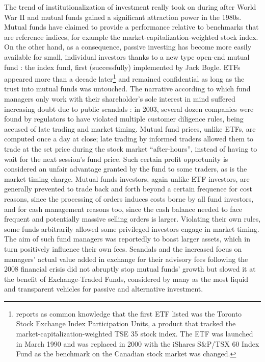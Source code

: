 The trend of institutionalization of investment really took on during after World War II and mutual funds gained a significant attraction power in the 1980s. Mutual funds have claimed to provide a performance relative to benchmarks that are reference indices, for example the market-capitalization-weighted stock index. On the other hand, as a consequence, passive investing has become more easily available for small, individual investors thanks to a new type open-end mutual fund : the index fund, first (successfully) implemented by Jack Bogle. ETFs appeared more than a decade later\footnote{\textcite{Charupat2013} reports as common knowledge that the first ETF listed was the Toronto Stock Exchange Index Participation Units, a product that tracked the market-capitalization-weighted TSE 35 stock index. The ETF was launched in March 1990 and was replaced in 2000 with the iShares S\&P/TSX 60 Index Fund as the benchmark on the Canadian stock market was changed.} and remained confidential as long as the trust into mutual funds was untouched. The narrative according to which fund managers only work with their shareholder's sole interest in mind suffered increasing doubt due to public scandals : in 2003, several dozen companies were found by regulators to have violated multiple customer diligence rules, being accused of late trading and market timing. Mutual fund prices, unlike ETFs, are computed once a day at close; late trading by informed traders allowed them to trade at the set price during the stock market ``after-hours'', instead of having to wait for the next session's fund price. Such certain profit opportunity is considered an unfair advantage granted by the fund to some traders, as is the market timing charge. Mutual funds investors, again unlike ETF investors, are generally prevented to trade back and forth beyond a certain frequence for cost reasons, since the processing of orders induces costs borne by all fund investors, and for cash management reasons too, since the cash balance needed to face frequent and potentially massive selling orders is larger. Violating their own rules, some funds arbitrarily allowed some privileged investors engage in market timing. The aim of such fund managers was reportedly to boast larger assets, which in turn positively influence their own fees. Scandals and the increased focus on managers' actual value added in exchange for their advisory fees following the 2008 financial crisis did not abruptly stop mutual funds' growth but slowed it at the benefit of Exchange-Traded Funds, considered by many as the most liquid and transparent vehicles for passive and alternative investment.

